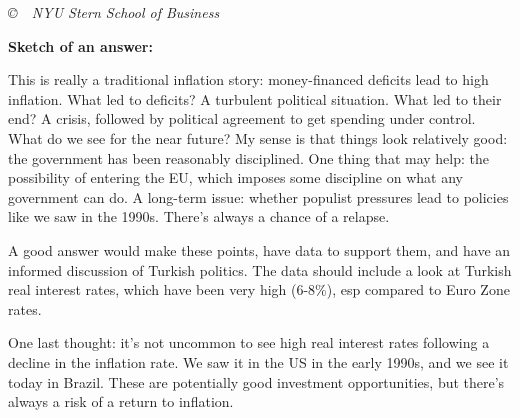 \documentclass[letterpaper,12pt]{article}
\begin{document}
\vfill
\centerline{\it \copyright \ \number\year \ NYU Stern School of Business}


\newpage
{\bf Sketch of an answer:}  

This is really a traditional inflation story:  money-financed deficits 
lead to high inflation.
What led to deficits?  A turbulent political situation.  
What led to their end?  A crisis, followed by political agreement 
to get spending under control.  
What do we see for the near future?  
My sense is that things look relatively good:  the government 
has been reasonably disciplined.
One thing that may help:  the possibility of entering the EU, 
which imposes some discipline on what any government can do.  
A long-term issue:  whether populist pressures lead to policies
like we saw in the 1990s.  There's always a chance of a relapse.  

A good answer would make these points, have data to support them, 
and have an informed discussion of Turkish politics.  
The data should include a look at Turkish real interest rates, 
which have been very high (6-8\%), esp compared to 
Euro Zone rates.   

One last thought:  it's not uncommon to see high real interest rates 
following a decline in the inflation rate.  We saw it in the US in the early 1990s, and we see it today in Brazil.  
These are potentially good investment opportunities, but
there's always a risk of a return to inflation.  
\end{document}
